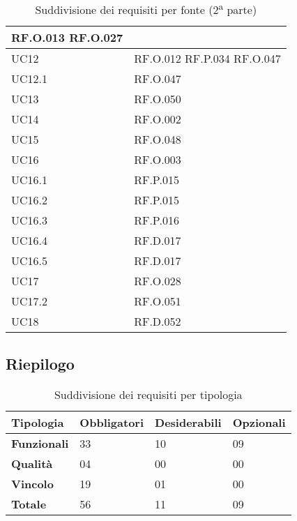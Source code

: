 \begin{table}[H]
\begin{tabular}{|C{3.0cm}|C{3.0cm}|}
        RF.O.013 \newline
        RF.O.027\\
        \hline
        UC12 &
        RF.O.012 \newline
        RF.P.034 \newline
        RF.O.047 \\
        \hline
        UC12.1 &
        RF.O.047 \\
        \hline
        UC13 &
        RF.O.050 \\
        \hline
        UC14 &
        RF.O.002 \\
        \hline
        UC15 &
        RF.O.048 \\
        \hline
        UC16 &
        RF.O.003 \\
        \hline
        UC16.1 &
        RF.P.015 \\
        \hline
        UC16.2 &
        RF.P.015 \\
        \hline
        UC16.3 &
        RF.P.016 \\
        \hline
        UC16.4 &
        RF.D.017 \\
        \hline
        UC16.5 &
        RF.D.017 \\
        \hline
        UC17 &
        RF.O.028 \\
        \hline
        UC17.2 &
        RF.O.051 \\
        \hline
        UC18 &
        RF.D.052 \\
        \hline
    \end{tabular}
    \caption{Suddivisione dei requisiti per fonte (2\textsuperscript{a} parte)}
\end{table}

\subsection{Riepilogo}
\begin{table}[H]
\centering
    \begin{tabular}{|C{3.0cm}|C{2.5cm}|C{2.5cm}|C{2.5cm}|}
        \hline
         \textbf{Tipologia} &
         \textbf{Obbligatori} & 
         \textbf{Desiderabili} &
         \textbf{Opzionali} 
          \\
          \hline
          \textbf{Funzionali} & 33 & 10 & 09 \\
          \hline 
          \textbf{Qualità} & 04 & 00 & 00\\
          \hline
          \textbf{Vincolo} & 19 & 01 & 00\\
          \hline
          \textbf{Totale} & 56 & 11 & 09\\
          \hline
    \end{tabular}
    \caption{Suddivisione dei requisiti per tipologia}
\end{table}
